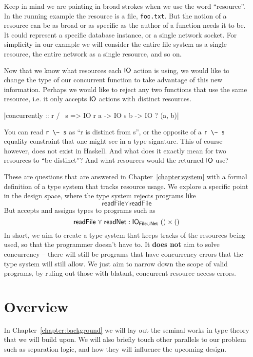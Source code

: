 \documentclass{report}
\begin{document}
Keep in mind we are painting in broad strokes when we use the word
``resource''. In the running example the resource is a file,
\texttt{foo.txt}. But the notion of a resource can be as broad or as specific as
the author of a function needs it to be. It could represent a specific database
instance, or a single network socket. For simplicity in our example we will
consider the entire file system as a single resource, the entire network as
a single resource, and so on.

Now that we know what resources each $\mathsf{IO}$ action is using, we would like to
change the type of our concurrent function to take advantage of this new
information. Perhaps we would like to reject any two functions that use the same
resource, i.e. it only accepts $\mathsf{IO}$ actions with distinct resources.

|concurrently :: r /~ s => IO r a -> IO s b -> IO ? (a, b)|

You can read \verb$r \~ s$ as ``r is distinct from s'', or the opposite of a
\verb$r \~ s$ equality constraint that one might see in a type signature. This
of course however, does not exist in Haskell.  And what does it exactly mean for
two resources to ``be distinct''? And what resources would the returned $\mathsf{IO}$
use?

These are questions that are answered in Chapter~\ref{chapter:system} with a
formal definition of a type system that tracks resource usage. We explore a
specific point in the design space, where the type system rejects programs like
\[
\textsf{readFile} \curlyvee \textsf{readFile}
\]
But accepts and assigns types to programs such as
\[
\textsf{readFile} \curlyvee \textsf{readNet} : \mathsf{IO}_{\textsf{File} \cup \textsf{Net}} \ () \times ()
\]
In short, we aim to create a type system that keeps tracks of the resources
being used, so that the programmer doesn't have to. It \textbf{does not} aim to
solve concurrency -- there will still be programs that have concurrency errors
that the type system will still allow. We just aim to narrow down the scope of
valid programs, by ruling out those with blatant, concurrent resource access
errors. 

\section{Overview}

In Chapter~\ref{chapter:background} we will lay out the seminal works in type
theory that we will build upon. We will also briefly touch other parallels to
our problem such as separation logic, and how they will influence the upcoming
design.
\end{document}

